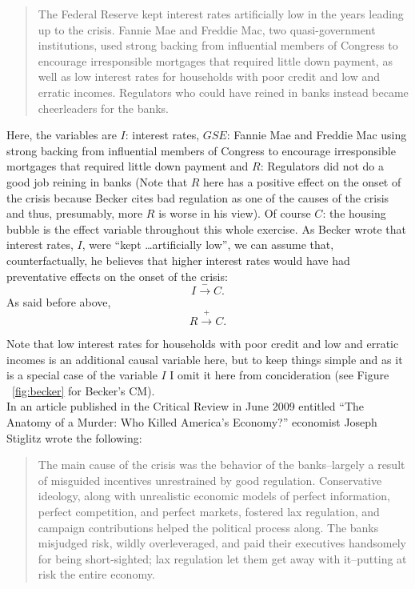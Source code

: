 \documentclass[12pt]{article}
\begin{document}
\begin{quotation}
The Federal Reserve kept interest rates artificially low in the years leading up to the crisis. Fannie Mae and Freddie Mac, two quasi-government institutions, used strong backing from influential members of Congress to encourage irresponsible mortgages that required little down payment, as well as low interest rates for households with poor credit and low and erratic incomes. Regulators who could have reined in banks instead became cheerleaders for the banks.
\end{quotation}

Here, the variables are $I$: interest rates, $GSE$: Fannie Mae and Freddie Mac using strong backing from influential members of Congress to encourage irresponsible mortgages that required little down payment and $R$: Regulators did not do a good job reining in banks (Note that $R$ here has a positive effect on the onset of the crisis because Becker cites bad regulation as one of the causes of the crisis and thus, presumably, more $R$ is worse in his view). Of course $C$: the housing bubble is the effect variable throughout this whole exercise. As Becker wrote that interest rates, $I$, were ``kept \ldots artificially low'', we can assume that, counterfactually, he believes that higher interest rates would have had preventative effects on the onset of the crisis:
$$I \xrightarrow{-} C.$$
As said before above,
$$R \xrightarrow{+} C.$$

Note that low interest rates for households with poor credit and low and erratic incomes is an additional causal variable here, but to keep things simple and as it is a special case of the variable $I$ I omit it here from concideration (see Figure ~\ref{fig:becker} for Becker's CM).\\

In an article published in the Critical Review in June 2009 entitled ``The Anatomy of a Murder: Who Killed America's Economy?'' economist Joseph Stiglitz wrote the following:

\begin{quotation}
The main cause of the crisis was the behavior of the banks--largely a result of misguided incentives unrestrained by good regulation. Conservative ideology, along with unrealistic economic models of perfect information, perfect competition, and perfect markets, fostered lax regulation, and campaign contributions helped the political process along. The banks misjudged risk, wildly overleveraged, and paid their executives handsomely for being short-sighted; lax regulation let them get away with it--putting at risk the entire economy.
\end{quotation}
\end{document}
